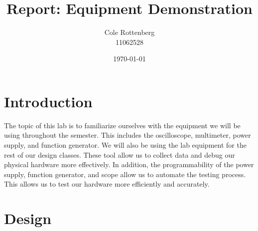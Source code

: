 \documentclass{article}
\title{Report: Equipment Demonstration}
\author{Cole Rottenberg \\ 11062528}
\date{\today}
\begin{document}
\maketitle

\section*{Introduction}
    The topic of this lab is to familiarize ourselves with the equipment we will be using throughout the semester. This includes the oscilloscope, multimeter, power supply, and function generator. We will also be using the lab equipment for the rest of our design classes. 
These tool allow us to collect data and debug our physical hardware more effectively. In addition, the programmability of the power supply, function generator, and scope allow us to automate the testing process. This allows us to test our hardware more efficiently and accurately.
\section*{Design}
\end{document}
